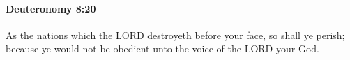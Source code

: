 
		\paragraph{Deuteronomy 8:20} %
			\label{DEUTERONOMY-8-20}

			As the nations which the LORD destroyeth before your face, so shall ye perish; because ye would not be obedient unto the voice of the LORD your God.

